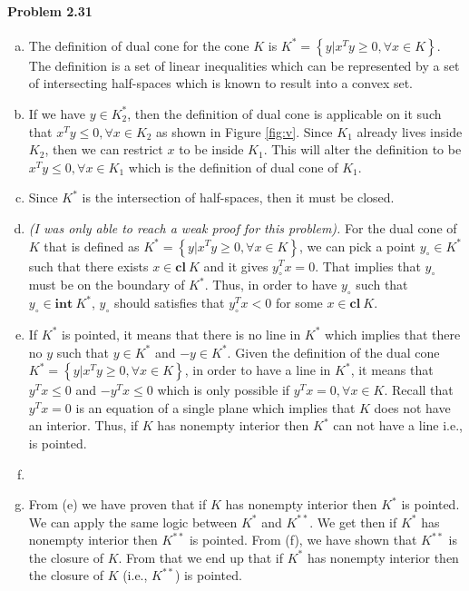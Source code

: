 \documentclass[12pt] {article}
\begin{document}
\paragraph{Problem 2.31}
\begin{enumerate}[(a)]
\item The definition of dual cone for the cone $K$ is $K^{*} = \left\lbrace y | x^{T}y\geq 0, \forall x \in K \right\rbrace$. The definition is a set of linear inequalities which can be represented by a set of intersecting half-spaces which is known to result into a convex set. 

\item If we have $y \in K^{*}_{2}$, then the definition of dual cone is applicable on it such that $x^{T}y\leq 0, \forall x \in K_{2}$ as shown in Figure \ref{fig:v}. Since $K_{1}$ already lives inside $K_{2}$, then we can restrict $x$  to be inside $K_{1}$. This will alter the definition to be $x^{T}y\leq 0, \forall x \in K_{1}$ which is the definition of dual cone of $K_{1}$. 

\item Since $K^{*}$ is the intersection of half-spaces, then it must be closed. 

\item \textit{(I was only able to reach a weak proof for this problem).} For the dual cone of $K$ that is defined as $K^{*} = \left\lbrace y | x^{T}y \geq 0, \forall x \in K \right\rbrace$, we can pick a point $y_{\circ} \in K^{*} $ such that there exists $x \in \mathbf{cl}\ K $ and it gives $y_{\circ}^{T}x=0$. That implies that $y_{\circ}$ must be on the boundary of $K^{*}$. Thus, in order to have $y_{\circ}$ such that $y_{\circ} \in \mathbf{int}\ K^{*}$, $y_{\circ}$ should satisfies that $y_{\circ}^{T}x < 0$ for some $x \in \mathbf{cl}\ K$. 

\item If $K^{*}$ is pointed, it means that there is no line in $K^{*}$ which implies that there no $y$ such that $y \in K^{*}$ and $-y \in K^{*}$. Given the definition of the dual cone $K^{*} = \left\lbrace y | x^{T}y\geq 0, \forall x \in K \right\rbrace$, in order to have a line in $K^{*}$, it means that $y^{T}x \leq 0$ and $-y^{T}x \leq 0$ which is only possible if $y^{T}x=0, \forall x \in K$. Recall that $y^{T}x=0$ is an equation of a single plane which implies that $K$ does not have an interior. Thus, if $K$ has nonempty interior then $K^{*}$ can not have a line i.e., is pointed. 

\item 

\item From (e) we have proven that if $K$ has nonempty interior then $K^{*}$ is pointed. We can apply the same logic between $K^{*}$ and $K^{**}$. We get then if $K^{*}$ has nonempty interior then $K^{**}$ is pointed. From (f), we have shown that $K^{**}$ is the closure of $K$. From that we end up that if $K^{*}$ has nonempty interior then the closure of $K$ (i.e., $K^{**}$) is pointed. 
\end{enumerate}
\end{document}
